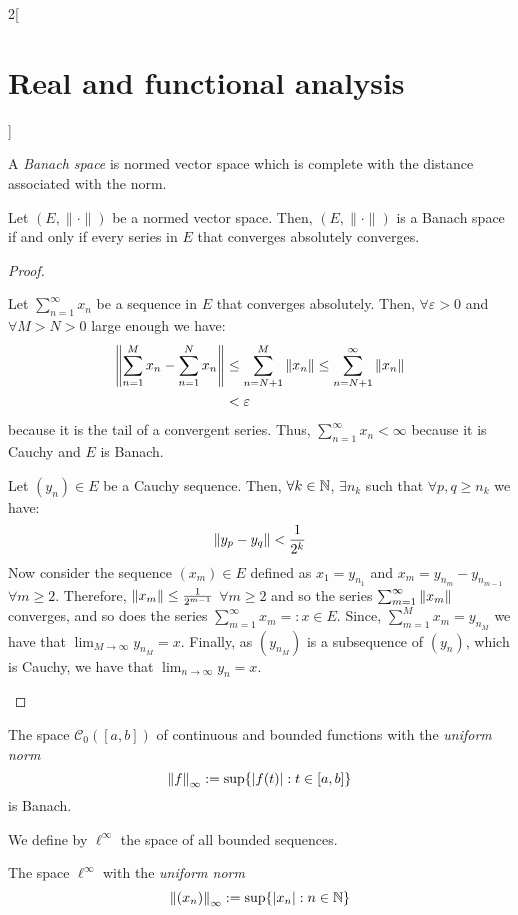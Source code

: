 \documentclass[../../../main_math.tex]{subfiles}
\begin{document}
\begin{multicols}{2}[\section{Real and functional analysis}]
\begin{definition}
    A \emph{Banach space} is normed vector space which is complete with the distance associated with the norm.
  \end{definition}
  \begin{theorem}
    Let $(E,\|\cdot\|)$ be a normed vector space. Then, $(E,\|\cdot\|)$ is a Banach space if and only if every series in $E$ that converges absolutely converges.
  \end{theorem}
  \begin{proof}
    \begin{itemizeiff}
      Let $\sum_{n=1}^\infty x_n$ be a sequence in $E$ that converges absolutely. Then, $\forall \varepsilon>0$ and $\forall M>N>0$ large enough we have:
      \begin{align*}
        \left\|\sum_{n=1}^M x_n-\sum_{n=1}^Nx_n\right\| & \leq \sum_{n=N+1}^M\left\|x_n\right\|\leq \sum_{n=N+1}^\infty\left\|x_n\right\| \\
                                                & <\varepsilon
      \end{align*}
      because it is the tail of a convergent series. Thus, $\sum_{n=1}^\infty x_n<\infty$ because it is Cauchy and $E$ is Banach.
      \item Let $(y_n)\in E$ be a Cauchy sequence. Then, $\forall k\in\mathbb{N}$, $\exists n_k$ such that $\forall p,q\geq n_k$ we have: $$\left\|y_p-y_q\right\|<\frac{1}{2^k}$$
      Now consider the sequence $(x_m)\in E$ defined as $x_1=y_{n_1}$ and $x_m=y_{n_m}-y_{n_{m-1}}$ $\forall m\geq 2$. Therefore, $\left\|x_m\right\|\leq \frac{1}{2^{m-1}}$ $\forall m\geq 2$ and so the series $\sum_{m=1}^\infty \left\|x_m\right\|$ converges, and so does the series $\sum_{m=1}^\infty x_m=:x\in E$. Since, $\sum_{m=1}^M x_m=y_{n_M}$ we have that $\displaystyle \lim_{M\to\infty} y_{n_M}=x$. Finally, as $(y_{n_M})$ is a subsequence of $(y_n)$, which is Cauchy, we have that $\displaystyle \lim_{n\to\infty} y_n=x$.
    \end{itemizeiff}
  \end{proof}
  \begin{proposition}
    The space $\mathcal{C}_0([a,b])$ of continuous and bounded functions with the \emph{uniform norm} $$\left\|f\right\|_\infty:=\sup\{\abs{f(t)}:t\in[a,b]\}$$
    is Banach.
  \end{proposition}
  \begin{definition}
    We define by $\ell^\infty$ the space of all bounded sequences.
  \end{definition}
  \begin{proposition}
    The space $\ell^\infty$ with the \emph{uniform norm} $$\left\|(x_n)\right\|_\infty:=\sup\{\abs{x_n}:n\in\mathbb{N}\}$$

\end{proposition}
\end{multicols}
\end{document}
